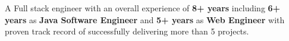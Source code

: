 \documentclass[10pt,a4paper,ragged2e,withhyper]{altacv}
\begin{document}
\begin{paracol}{2}
\begin{itemize}
\end{itemize}











\switchcolumn

A Full stack engineer with an overall experience of \textbf{8+ years} including \textbf{6+ years} as \textbf{Java Software Engineer} and \textbf{5+ years} as \textbf{Web Engineer} with proven track record of successfully delivering more than 5 projects.\\~\\


\end{paracol}
\end{document}
